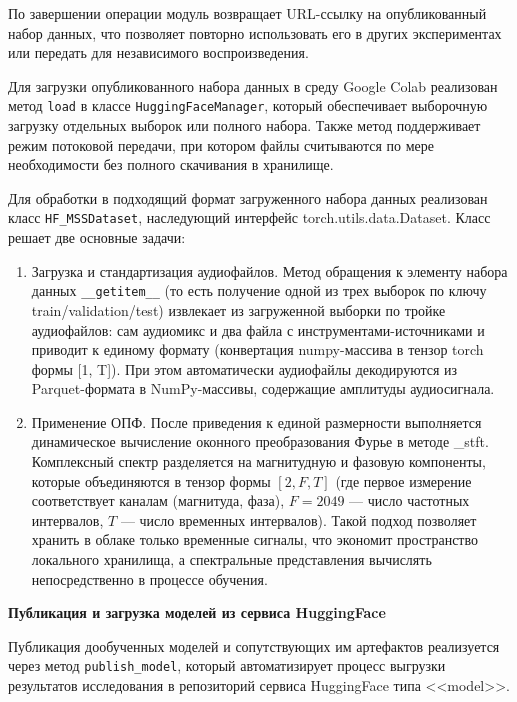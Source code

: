 \documentclass[14pt]{extarticle}
\begin{document}
По завершении операции модуль возвращает URL-ссылку на опубликованный набор данных, что позволяет повторно использовать его в 
других экспериментах или передать для независимого воспроизведения.

Для загрузки опубликованного набора данных в среду Google Colab реализован 
метод \texttt{load} в классе \texttt{HuggingFaceManager}, который обеспечивает выборочную загрузку отдельных выборок или полного набора.
Также метод поддерживает режим потоковой передачи, при котором файлы считываются по мере необходимости 
без полного скачивания в хранилище.

Для обработки в подходящий формат загруженного набора данных реализован класс \texttt{HF\_MSSDataset},
наследующий интерфейс torch.utils.data.Dataset. Класс решает две основные задачи:
\begin{enumerate}[label=\arabic*)]
	\item Загрузка и стандартизация аудиофайлов. Метод обращения к элементу набора данных \texttt{\_\_getitem\_\_} (то есть получение одной из трех выборок по ключу train/validation/test)
	извлекает из загруженной выборки по тройке аудиофайлов: сам аудиомикс и два файла с инструментами-источниками
	и приводит к единому формату (конвертация numpy-массива в тензор torch формы [1, T]).
	При этом автоматически аудиофайлы декодируются из Parquet-формата в NumPy-массивы, содержащие амплитуды аудиосигнала.
	\item Применение ОПФ. После приведения к единой размерности выполняется динамическое вычисление оконного преобразования Фурье
	в методе \_stft. Комплексный спектр разделяется на магнитудную и фазовую компоненты, которые объединяются в тензор 
	формы $[2, F, T]$ (где первое измерение соответствует каналам (магнитуда, фаза), $F = 2049$ --- число частотных интервалов, $T$ --- число временных интервалов).
	Такой подход позволяет хранить в облаке только временные сигналы, что экономит пространство локального хранилища, 
	а спектральные представления вычислять непосредственно в процессе обучения.
\end{enumerate}

\par\textbf{Публикация и загрузка моделей из сервиса HuggingFace}

Публикация дообученных моделей и сопутствующих им артефактов реализуется через метод 
\texttt{publish\_model}, который автоматизирует процесс выгрузки результатов исследования в 
репозиторий сервиса HuggingFace типа <<model>>.
\end{document}
